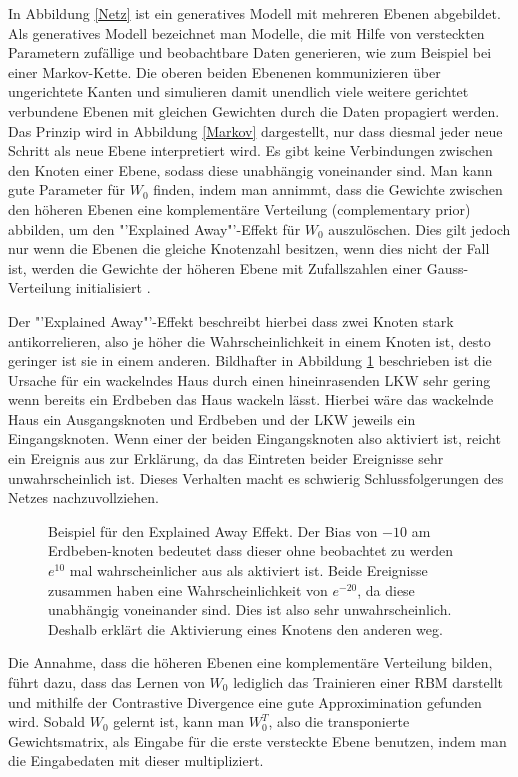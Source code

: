 \documentclass[12pt]{article}
\begin{document}
In Abbildung \ref{Netz} ist ein generatives Modell mit mehreren Ebenen abgebildet. Als generatives Modell bezeichnet man Modelle, die mit Hilfe von versteckten Parametern zufällige und  beobachtbare Daten generieren, wie zum Beispiel bei einer Markov-Kette. Die oberen beiden Ebenenen kommunizieren über ungerichtete Kanten und simulieren damit unendlich viele weitere gerichtet verbundene Ebenen mit gleichen Gewichten durch die Daten propagiert werden. Das Prinzip wird in Abbildung \ref{Markov} dargestellt, nur dass diesmal jeder neue Schritt als neue Ebene interpretiert wird.  Es gibt keine Verbindungen zwischen den Knoten einer Ebene, sodass diese unabhängig voneinander sind.  Man kann gute Parameter für $W_0$ finden, indem man annimmt, dass die  Gewichte zwischen den höheren Ebenen eine komplementäre Verteilung (complementary prior) abbilden, um den "'Explained Away"'-Effekt für $W_0$ auszulöschen. Dies gilt jedoch nur wenn die Ebenen die gleiche Knotenzahl besitzen, wenn dies nicht der Fall ist, werden die Gewichte der höheren Ebene mit Zufallszahlen einer Gauss-Verteilung initialisiert \cite{learning}.

Der "'Explained Away"'-Effekt beschreibt hierbei dass zwei Knoten stark antikorrelieren, also je höher die Wahrscheinlichkeit in einem Knoten ist, desto geringer ist sie in einem anderen. 
Bildhafter in Abbildung \ref{ExplainedAway} beschrieben ist die Ursache für ein wackelndes Haus durch einen hineinrasenden LKW sehr gering wenn bereits ein Erdbeben das Haus wackeln lässt. Hierbei wäre das wackelnde Haus ein Ausgangsknoten und Erdbeben und der LKW jeweils ein Eingangsknoten. Wenn einer der beiden Eingangsknoten also aktiviert ist, reicht ein Ereignis aus zur Erklärung, da das Eintreten beider Ereignisse sehr unwahrscheinlich ist. Dieses Verhalten macht es schwierig Schlussfolgerungen des Netzes nachzuvollziehen. 

\begin{figure}[H]
	\center
	
	\caption{Beispiel für den Explained Away Effekt. Der Bias von $-10$ am Erdbeben-knoten bedeutet dass dieser ohne beobachtet zu werden $e^{10}$ mal wahrscheinlicher aus als aktiviert ist. Beide Ereignisse zusammen haben eine Wahrscheinlichkeit von $e^{-20}$, da diese unabhängig voneinander sind. Dies ist also sehr unwahrscheinlich. Deshalb erklärt die Aktivierung eines Knotens den anderen weg.}
	\label{ExplainedAway}
\end{figure}

Die Annahme, dass die höheren Ebenen eine komplementäre Verteilung bilden, führt dazu, dass das Lernen von $W_0$ lediglich das Trainieren einer RBM darstellt und mithilfe der Contrastive Divergence eine gute Approximination gefunden wird. Sobald $W_0$ gelernt ist, kann man $W^T_0$, also die transponierte Gewichtsmatrix, als Eingabe für die erste versteckte Ebene benutzen, indem man die Eingabedaten mit dieser multipliziert.
\end{document}
